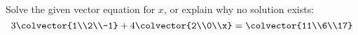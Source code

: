 Solve the given vector equation for $x$, or explain why no solution exists:
%
\begin{equation*}
    3\colvector{1\\2\\-1}+
   4\colvector{2\\0\\x}=
      \colvector{11\\6\\17}
\end{equation*}
%